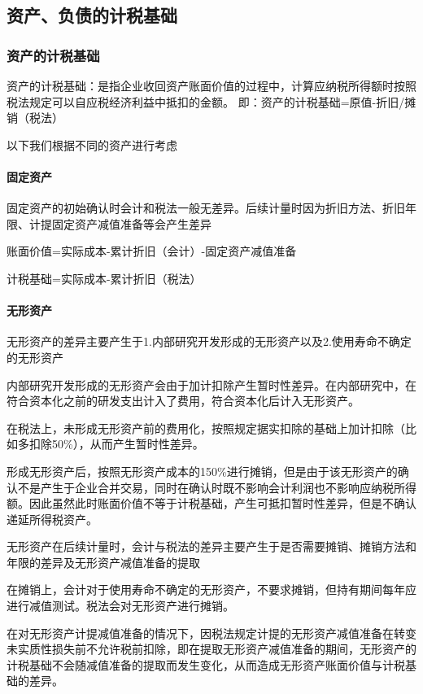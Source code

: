 \documentclass[UTF8,12pt]{ctexart}
\numberwithin{equation}{section} %
\numberwithin{figure}{section}
\numberwithin{table}{section}
\begin{document}
	\subsection{资产、负债的计税基础}
	\subsubsection{资产的计税基础}
	资产的计税基础：是指企业收回资产账面价值的过程中，计算应纳税所得额时按照税法规定可以自应税经济利益中抵扣的金额。
	即：资产的计税基础=原值-折旧/摊销（税法）
	
	以下我们根据不同的资产进行考虑
	\paragraph{固定资产}
	固定资产的初始确认时会计和税法一般无差异。后续计量时因为折旧方法、折旧年限、计提固定资产减值准备等会产生差异
	
	账面价值=实际成本-累计折旧（会计）-固定资产减值准备
	
	计税基础=实际成本-累计折旧（税法）
	
	\paragraph{无形资产}
	无形资产的差异主要产生于1.内部研究开发形成的无形资产以及2.使用寿命不确定的无形资产
	
	内部研究开发形成的无形资产会由于加计扣除产生暂时性差异。在内部研究中，在符合资本化之前的研发支出计入了费用，符合资本化后计入无形资产。
	
	在税法上，未形成无形资产前的费用化，按照规定据实扣除的基础上加计扣除（比如多扣除50\%），从而产生暂时性差异。
	
	形成无形资产后，按照无形资产成本的150\%进行摊销，但是由于该无形资产的确认不是产生于企业合并交易，同时在确认时既不影响会计利润也不影响应纳税所得额。因此虽然此时账面价值不等于计税基础，产生可抵扣暂时性差异，但是不确认递延所得税资产。
	
	无形资产在后续计量时，会计与税法的差异主要产生于是否需要摊销、摊销方法和年限的差异及无形资产减值准备的提取
	
	在摊销上，会计对于使用寿命不确定的无形资产，不要求摊销，但持有期间每年应进行减值测试。税法会对无形资产进行摊销。
	
	在对无形资产计提减值准备的情况下，因税法规定计提的无形资产减值准备在转变未实质性损失前不允许税前扣除，即在提取无形资产减值准备的期间，无形资产的计税基础不会随减值准备的提取而发生变化，从而造成无形资产账面价值与计税基础的差异。
	
\end{document}
